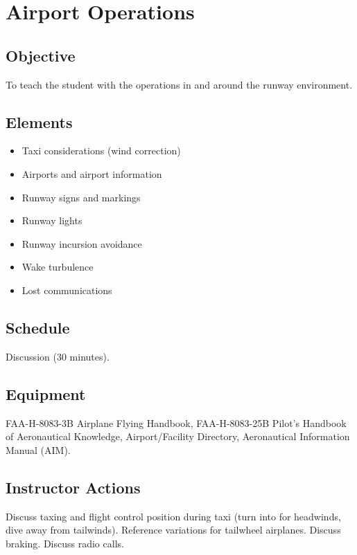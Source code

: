 
\section{Airport Operations}

\subsection{Objective}

To teach the student with the operations in and around the runway environment.

\subsection{Elements}

\begin{itemize}
  \item Taxi considerations (wind correction)
  \item Airports and airport information
  \item Runway signs and markings
  \item Runway lights
  \item Runway incursion avoidance
  \item Wake turbulence
  \item Lost communications
\end{itemize}

\subsection{Schedule}

Discussion (30 minutes).

\subsection{Equipment}

FAA-H-8083-3B Airplane Flying Handbook, FAA-H-8083-25B Pilot's Handbook of
Aeronautical Knowledge, Airport/Facility Directory, Aeronautical Information
Manual (AIM).

\subsection{Instructor Actions}

Discuss taxing and flight control position during taxi (turn into for
headwinds, dive away from tailwinds). Reference variations for tailwheel
airplanes. Discuss braking. Discuss radio calls.

